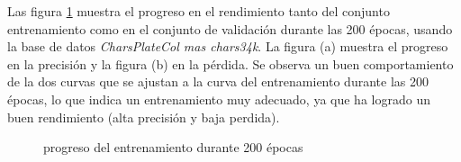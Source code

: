 

Las figura \ref{fig:progreso del entrenamiento durante 200 épocas modelo2} muestra el progreso en el rendimiento tanto del conjunto entrenamiento como en el conjunto de validación durante las 200 épocas, usando la base de datos \textit{CharsPlateCol mas chars34k}. La figura (a) muestra el progreso en la precisión y la figura (b) en la pérdida. Se observa un buen comportamiento de la dos curvas que se ajustan a la curva del entrenamiento durante las 200 épocas, lo que indica un entrenamiento muy adecuado, ya que ha logrado un buen rendimiento (alta precisión y baja perdida). 

\begin{figure}[H]
    \caption{progreso del entrenamiento durante 200 épocas}
    \label{fig:progreso del entrenamiento durante 200 épocas modelo2}  
\end{figure}


